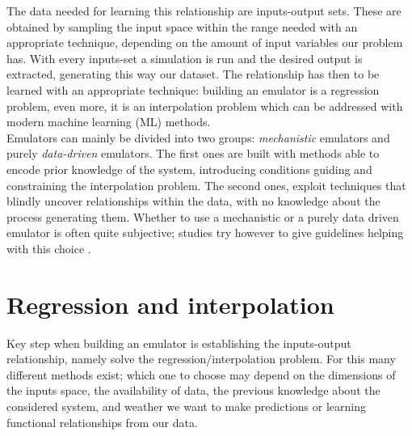 The data needed for learning this relationship are inputs-output sets.
These are obtained by sampling the input space within the range needed with an appropriate technique, depending on the amount of input variables our problem has.
With every inputs-set a simulation is run and the desired output is extracted, generating this way our dataset.
The relationship has then to be learned with an appropriate technique: building an emulator is a regression problem, even more, it is an interpolation problem \autocite{carbajal_emumore_2017} which can be addressed with modern machine learning (ML) methods.\\

Emulators can mainly be divided into two groups: \emph{mechanistic} emulators and purely \emph{data-driven} emulators.
The first ones are built with methods able to encode prior knowledge of the system, introducing conditions guiding and constraining the interpolation problem.
The second ones, exploit techniques that blindly uncover relationships within the data, with no knowledge about the process generating them.
Whether to use a mechanistic or a purely data driven emulator is often quite subjective; studies try however to give guidelines helping with this choice \autocite{carbajal_appraisal_2016}.




\section{Regression and interpolation}\label{sec:regression_interpolation}


Key step when building an emulator is establishing the inputs-output relationship, namely solve the regression/interpolation problem.
For this many different methods exist; which one to choose may depend on the dimensions of the inputs space, the availability of data, the previous knowledge about the considered system, and weather we want to make predictions or learning functional relationships from our data.\\

